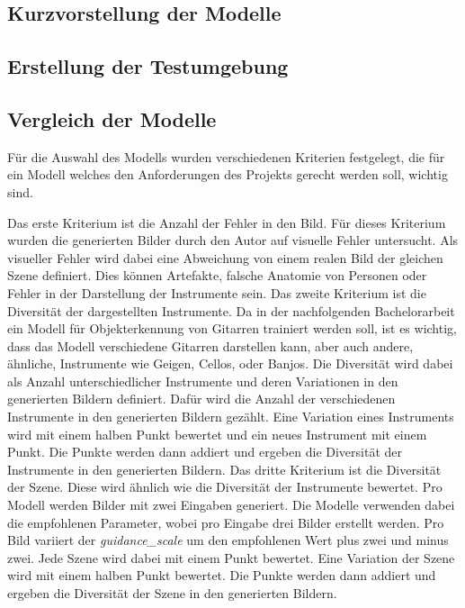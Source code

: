 \subsection{Kurzvorstellung der Modelle}

\subsection{Erstellung der Testumgebung}
\subsection{Vergleich der Modelle}
Für die Auswahl des Modells wurden verschiedenen Kriterien festgelegt, die für ein Modell welches den Anforderungen des Projekts gerecht werden soll, wichtig sind.

Das erste Kriterium ist die Anzahl der Fehler in den Bild. Für dieses Kriterium wurden die generierten Bilder durch den Autor auf visuelle Fehler untersucht. Als visueller Fehler wird dabei eine Abweichung von einem realen Bild der gleichen Szene definiert. Dies können Artefakte, falsche Anatomie von Personen oder Fehler in der Darstellung der Instrumente sein.
Das zweite Kriterium ist die Diversität der dargestellten Instrumente. Da in der nachfolgenden Bachelorarbeit ein Modell für Objekterkennung von Gitarren trainiert werden soll, ist es wichtig, dass das Modell verschiedene Gitarren darstellen kann, aber auch andere, ähnliche, Instrumente wie Geigen, Cellos, oder Banjos. Die Diversität wird dabei als Anzahl unterschiedlicher Instrumente und deren Variationen in den generierten Bildern definiert. Dafür wird die Anzahl der verschiedenen Instrumente in den generierten Bildern gezählt. Eine Variation eines Instruments wird mit einem halben Punkt bewertet und ein neues Instrument mit einem Punkt. Die Punkte werden dann addiert und ergeben die Diversität der Instrumente in den generierten Bildern.
Das dritte Kriterium ist die Diversität der Szene. Diese wird ähnlich wie die Diversität der Instrumente bewertet. Pro Modell werden Bilder mit zwei Eingaben generiert. Die Modelle verwenden dabei die empfohlenen Parameter, wobei pro Eingabe drei Bilder erstellt werden. Pro Bild variiert der \emph{guidance_scale} um den empfohlenen Wert plus zwei und minus zwei. Jede Szene wird dabei mit einem Punkt bewertet. Eine Variation der Szene wird mit einem halben Punkt bewertet. Die Punkte werden dann addiert und ergeben die Diversität der Szene in den generierten Bildern.


